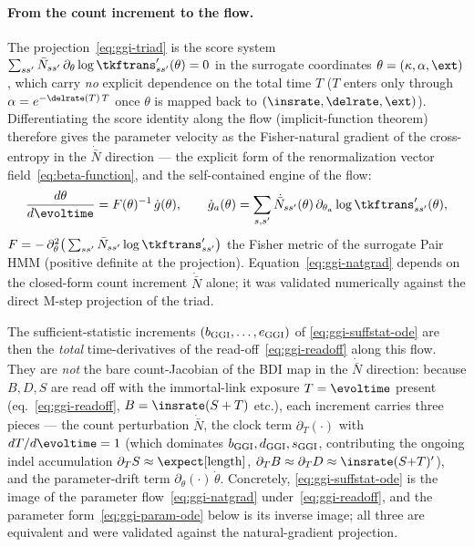 \paragraph{From the count increment to the flow.}
The projection~\eqref{eq:ggi-triad} is the score system
$\sum_{ss'}\bar N_{ss'}\,\partial_\theta\log\tkftrans'_{ss'}(\theta)=0$ in the
surrogate coordinates $\theta=(\kappa,\alpha,\ext)$, which carry \emph{no}
explicit dependence on the total time $T$ ($T$ enters only through
$\alpha=e^{-\delrate(T)\,T}$ once $\theta$ is mapped back to
$(\insrate,\delrate,\ext)$).  Differentiating the score identity along the flow
(implicit-function theorem) therefore gives the parameter velocity as the
Fisher-natural gradient of the cross-entropy in the $\dot{\bar N}$ direction ---
the explicit form of the renormalization vector field~\eqref{eq:beta-function},
and the self-contained engine of the flow:
\begin{equation}
\label{eq:ggi-natgrad}
\frac{d\theta}{d\evoltime}
  = F(\theta)^{-1}\,\dot g(\theta),
\qquad
\dot g_a(\theta)=\sum_{s,s'}\dot{\bar N}_{ss'}(\theta)\,
   \partial_{\theta_a}\log\tkftrans'_{ss'}(\theta),
\end{equation}
$F=-\,\partial_\theta^2\big(\sum_{ss'}\bar N_{ss'}\log\tkftrans'_{ss'}\big)$ the
Fisher metric of the surrogate Pair HMM (positive definite at the projection).
Equation~\eqref{eq:ggi-natgrad} depends on the closed-form count increment
$\dot{\bar N}$ alone; it was validated numerically against the direct M-step
projection of the triad.

The sufficient-statistic increments $(b_{\mathrm{GGI}},\dots,e_{\mathrm{GGI}})$ of
\eqref{eq:ggi-suffstat-ode} are then the \emph{total} time-derivatives of the
read-off~\eqref{eq:ggi-readoff} along this flow.  They are \emph{not} the bare
count-Jacobian of the BDI map in the $\dot{\bar N}$ direction: because $B,D,S$
are read off with the immortal-link exposure $T=\evoltime$ present
(eq.~\eqref{eq:ggi-readoff}, $B=\insrate(S+T)$ etc.), each increment carries
three pieces --- the count perturbation $\dot{\bar N}$, the clock term
$\partial_T(\cdot)$ with $dT/d\evoltime=1$ (which dominates $b_{\mathrm{GGI}},d_{\mathrm{GGI}},s_{\mathrm{GGI}}$,
contributing the ongoing indel accumulation $\partial_T S\approx\expect[\text{length}]$,
$\partial_T B\approx\partial_T D\approx\insrate(S{+}T)'$), and the
parameter-drift term $\partial_\theta(\cdot)\,\dot\theta$.  Concretely,
\eqref{eq:ggi-suffstat-ode} is the image of the parameter
flow~\eqref{eq:ggi-natgrad} under~\eqref{eq:ggi-readoff}, and the parameter
form~\eqref{eq:ggi-param-ode} below is its inverse image; all three are
equivalent and were validated against the natural-gradient projection.

